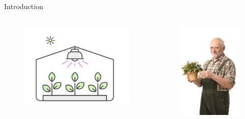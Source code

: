 \begin{frame}{Introduction}
{\begin{columns}
\begin{column}{0.5\textwidth}
\begin{figure}
                    \includegraphics[scale=0.175]{figures/4_lights.png}
                \end{figure}
            \end{column}
            \begin{column}{0.5\textwidth}
                \begin{figure}
                    \centering
                    \includegraphics[scale=0.1]{figures/gardener.jpeg}

\end{figure}
\end{column}
\end{columns}}
\end{frame}
